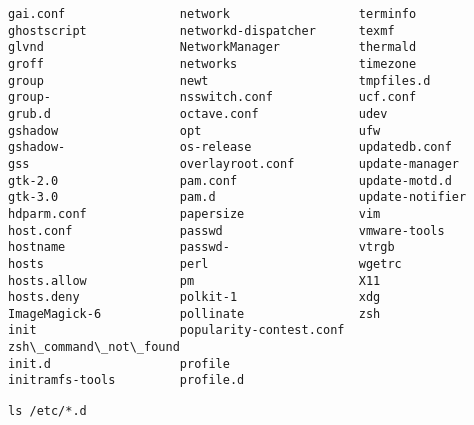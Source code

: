 \documentclass[11pt]{article}
\makeatletter
\newcommand{\boxspacing}{\kern\kvtcb@left@rule\kern\kvtcb@boxsep}
\newcommand{\prompt}[4]{
        \ttfamily\llap{{\color{#2}[#3]:\hspace{3pt}#4}}\vspace{-\baselineskip}
    }
\makeatother
\begin{document}
\begin{Verbatim}[commandchars=\\\{\}]
gai.conf                network                  terminfo
ghostscript             networkd-dispatcher      texmf
glvnd                   NetworkManager           thermald
groff                   networks                 timezone
group                   newt                     tmpfiles.d
group-                  nsswitch.conf            ucf.conf
grub.d                  octave.conf              udev
gshadow                 opt                      ufw
gshadow-                os-release               updatedb.conf
gss                     overlayroot.conf         update-manager
gtk-2.0                 pam.conf                 update-motd.d
gtk-3.0                 pam.d                    update-notifier
hdparm.conf             papersize                vim
host.conf               passwd                   vmware-tools
hostname                passwd-                  vtrgb
hosts                   perl                     wgetrc
hosts.allow             pm                       X11
hosts.deny              polkit-1                 xdg
ImageMagick-6           pollinate                zsh
init                    popularity-contest.conf  zsh\_command\_not\_found
init.d                  profile
initramfs-tools         profile.d
    \end{Verbatim}

    \begin{tcolorbox}[breakable, size=fbox, boxrule=1pt, pad at break*=1mm,colback=cellbackground, colframe=cellborder]
\prompt{In}{incolor}{72}{\boxspacing}
\begin{Verbatim}[commandchars=\\\{\}]
ls /etc/*.d
\end{Verbatim}
\end{tcolorbox}
\end{document}
